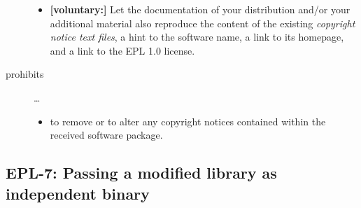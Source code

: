 \begin{description}
\begin{itemize}
  \item \textbf{[voluntary:]} Let the documentation of your distribution and/or
  your additional material  also reproduce the content of the existing
  \emph{copyright notice text files}, a hint to the software name, a link to its
  homepage, and a link to the EPL 1.0 license.

\end{itemize}

\item[prohibits] \ldots
\begin{itemize}
  \item to remove or to alter any copyright notices contained within the
  received software package.
\end{itemize}

\end{description}


\subsection{EPL-7: Passing a modified library as independent binary}

